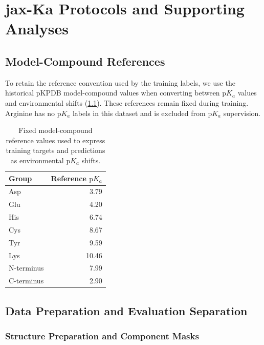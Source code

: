 \chapter{jax-Ka Protocols and Supporting Analyses}
\label{app:jaxka-protocols}

\section{Model-Compound References}
\label{app:jaxka-references}

To retain the reference convention used by the training labels, we use the historical pKPDB model-compound values when converting between $\mathrm{p}K_a$ values and environmental shifts (\cref{tab:jaxka-model-compound-values}). These references remain fixed during training. Arginine has no $\mathrm{p}K_a$ labels in this dataset and is excluded from $\mathrm{p}K_a$ supervision.

\begin{table}[htbp]
    \centering
    \begin{tabular}{lr}
        \toprule
        Group & Reference $\mathrm{p}K_a$ \\
        \midrule
        Asp & 3.79 \\
        Glu & 4.20 \\
        His & 6.74 \\
        Cys & 8.67 \\
        Tyr & 9.59 \\
        Lys & 10.46 \\
        N-terminus & 7.99 \\
        C-terminus & 2.90 \\
        \bottomrule
    \end{tabular}
    \caption{Fixed model-compound reference values used to express training targets and predictions as environmental $\mathrm{p}K_a$ shifts.}
    \label{tab:jaxka-model-compound-values}
\end{table}

\section{Data Preparation and Evaluation Separation}
\label{app:jaxka-data-preparation}

\subsection{Structure Preparation and Component Masks}
\label{app:jaxka-components}

